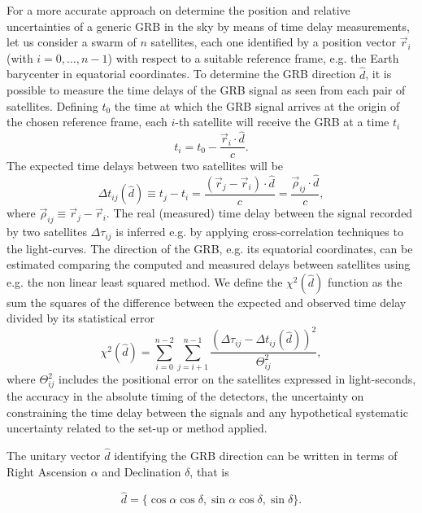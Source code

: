 \documentclass[]{spie}  %
\begin{document}
For a more accurate approach on determine the position and relative uncertainties of a generic GRB in the sky by means of time delay measurements, let us consider a swarm of $n$ satellites, each one identified by a position vector $\vec{r}_i$ (with $i=0,\dots, n-1$) with respect to a suitable reference frame, e.g. the Earth barycenter in equatorial coordinates.
To determine the GRB direction $\hat{d}$, it is possible to measure the time delays of the GRB signal as seen from each pair of  satellites. 
Defining $t_0$ the time at which the GRB signal arrives at the origin of the chosen reference frame, each $i$-th satellite will receive the GRB at a time $t_i$
\begin{equation}
  t_i = t_0 - \frac{\vec{r}_i \cdot \hat{d}}{c}.
\end{equation}
The expected time delays between two satellites will be
\begin{equation}
    \Delta t_{ij}(\hat{d}) \equiv t_j - t_i = \frac{(\vec{r}_j - \vec{r}_i) \cdot \hat{d}}{c} =  \frac{\vec{\rho}_{ij} \cdot \hat{d}}{c},
\label{eq:delayexp}
\end{equation}
where $\vec{\rho}_{ij} \equiv \vec{r}_j - \vec{r}_i$.
The real (measured) time delay between the signal recorded by two satellites $\Delta \tau_{ij}$ is inferred e.g. by applying cross-correlation techniques to the light-curves.
The direction of the GRB, e.g. its equatorial coordinates, can be estimated comparing the computed and measured delays between satellites using e.g. the non linear least squared method.
We define the $\chi^2(\hat{d})$ function as the sum the squares of the difference between the expected and observed time delay divided by its statistical error
  \begin{equation}
    \chi^2(\hat{d}) = \sum_{i = 0}^{n - 2}\sum_{j = i + 1}^{n - 1} \frac{(\Delta \tau_{ij} - \Delta t_{ij}(\hat{d}))^2}{\Theta_{ij}^2},
    \label{eq:chisq}
  \end{equation}
where $\Theta_{ij}^2$ includes the positional error on the satellites expressed in light-seconds, the accuracy in the absolute timing of the detectors, the uncertainty on constraining the time delay between the signals and any hypothetical systematic uncertainty related to the set-up or method applied.
  
The unitary vector $\hat{d}$ identifying the GRB direction can be written in terms of Right Ascension $\alpha$ and Declination $\delta$, that is
  
  \begin{equation}
    \hat{d} = \{\cos{\alpha} \cos{\delta}, \sin{\alpha} \cos{\delta}, \sin{\delta}\}.
  \end{equation}
\end{document}
